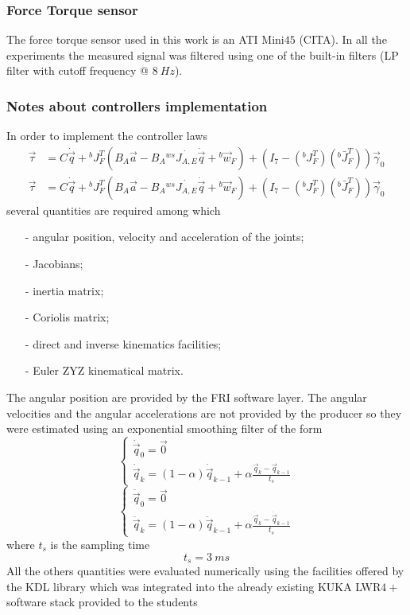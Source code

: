 \subsubsection{Force Torque sensor}
The force torque sensor used in this work is an ATI Mini$45$ (CITA).
In all the experiments the measured signal was filtered using one of the
built-in filters (LP filter with cutoff frequency @ $\SI{8}{Hz}$).

\subsubsection{Notes about controllers implementation}
In order to implement the controller laws
\[
\begin{split}
  \vec{\tau} &= C \dot{\vec{q}} + {}^{b}J^{T}_{F} ( B_A \vec{a} - B_A {}^{ws} \dot{J_{A,E}} \dot{\vec{q}} + {}^b\vec{w}_{F}) +
  (I_7 - ({}^{b}J^{T}_{F}) ({}^{b} \bar{J}^{T}_{F})) \vec{\gamma}_{0}\\
  \vec{\tau} &= C \dot{\vec{q}} + {}^{b}J^{T}_{F} ( B_A \vec{a} - B_A {}^{ws} \dot{J_{A,E}} \dot{\vec{q}} + {}^b\vec{w}_{F}) +
  (I_7 - ({}^{b}J^{T}_{F}) ({}^{b} \bar{J}^{T}_{F})) \vec{\gamma}_{0}
\end{split}
\]
several quantities are required among which
\begin{itemize}
\item[-] angular position, velocity and acceleration of the joints;
\item[-] Jacobians;
\item[-] inertia matrix;
\item[-] Coriolis matrix;
\item[-] direct and inverse kinematics facilities;
\item[-] Euler ZYZ kinematical matrix.
\end{itemize}
\par
The angular position are provided by the FRI software layer.
The angular velocities and the angular accelerations are not provided by
the producer so they were estimated using an exponential smoothing filter of the 
form
\[
\begin{cases}
  \dot{\vec{q}}_0 = \vec{0} \\
  \dot{\vec{q}}_k = (1 - \alpha) \dot{\vec{q}}_{k-1} + \alpha \frac{\vec{q}_k - \vec{q}_{k-1}}{t_s}
\end{cases}
\]
\[
\begin{cases}
  \ddot{\vec{q}}_0 = \vec{0} \\
  \ddot{\vec{q}}_k = (1 - \alpha) \ddot{\vec{q}}_{k-1} + \alpha \frac{\dot{\vec{q}}_k - \dot{\vec{q}}_{k-1}}{t_s}
\end{cases}
\]
where $t_s$ is the sampling time
\[
t_s = \SI{3}{ms}
\]
All the others quantities were evaluated numerically using the facilities offered by the KDL library which was
integrated into the already existing KUKA LWR$4+$ software stack provided to the students

